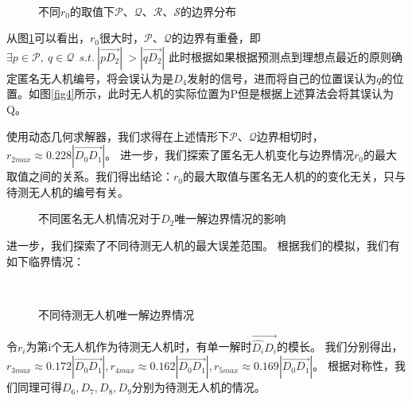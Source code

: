 \documentclass[withoutpreface,bwprint]{cumcmthesis} %
\begin{document}
			\begin{figure}[H]
				\centering
				\\
				\caption{不同$r_0$的取值下$\mathcal{P}\text{、}\mathcal{Q}\text{、}\mathcal{R}\text{、}\mathcal{S}$的边界分布}
				\label{fig7}
			\end{figure}
			从图\ref{fig7}可以看出，$r_0$很大时，$\mathcal{P}\text{、}\mathcal{Q}$的边界有重叠，即$
			\exists p\in \mathcal{P},\ q\in \mathcal{Q}\ \ s.t.\ \left| \overrightarrow{pD_2} \right|\ >\left| \overrightarrow{qD_2} \right|$ 此时根据如果根据预测点到理想点最近的原则确定匿名无人机编号，将会误认为是$D_4$发射的信号，进而将自己的位置误认为$q$的位置。如图\ref{fig4}所示，此时无人机的实际位置为P但是根据上述算法会将其误认为Q。
			
			使用动态几何求解器，我们求得在上述情形下$\mathcal{P}\text{、}\mathcal{Q}$边界相切时，$r_{2max}\approx 0.228\left| \overrightarrow{D_0D_1} \right|$。
			进一步，我们探索了匿名无人机变化与边界情况$r_0$的最大取值之间的关系。我们得出结论：$r_0$的最大取值与匿名无人机的的变化无关，只与待测无人机的编号有关。
			\begin{figure}[H]
				\centering
				\caption{不同匿名无人机情况对于$D_2$唯一解边界情况的影响}
				\label{fig10}
			\end{figure}
		
			进一步，我们探索了不同待测无人机的最大误差范围。
			根据我们的模拟，我们有如下临界情况：
			\begin{figure}[H]
				\centering
				\\
				\caption{不同待测无人机唯一解边界情况}
				\label{fig12}
			\end{figure}
			令$r_i$为第i个无人机作为待测无人机时，有单一解时$\overrightarrow{\widehat{D_i}D_i}$的模长。
			我们分别得出，$r_{3max}\approx 0.172\left| \overrightarrow{D_0D_1} \right|,r_{4max}\approx 0.162\left| \overrightarrow{D_0D_1} \right|,r_{5max}\approx 0.169\left| \overrightarrow{D_0D_1} \right|$。
			根据对称性，我们同理可得$D_6,D_7,D_8,D_9$分别为待测无人机的情况。
			
\end{document}
